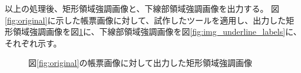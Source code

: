 以上の処理後、矩形領域強調画像と、下線部領域強調画像を出力する。
図\ref{fig:original}に示した帳票画像に対して、試作したツールを適用し、出力した矩形領域強調画像を図\ref{fig:img_rect_labels}に、下線部領域強調画像を図\ref{fig:img_underline_labels}に、それぞれ示す。
\begin{figure}[tp]
    \begin{center}
        \caption{図\ref{fig:original}の帳票画像に対して出力した矩形領域強調画像}
        \label{fig:img_rect_labels}
    \end{center}
\end{figure}
